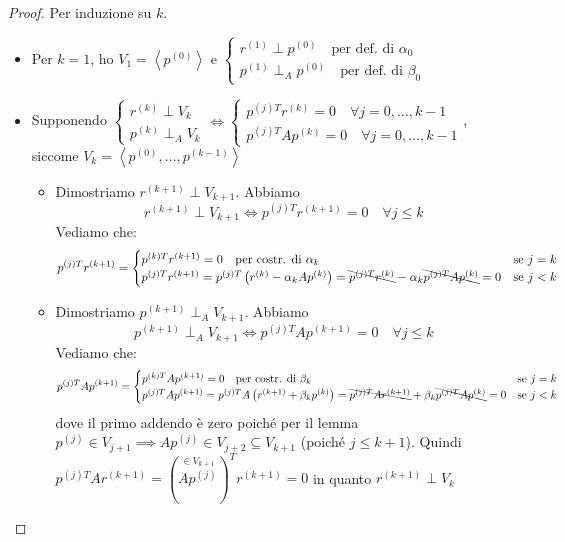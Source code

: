 \documentclass[a4paper,10pt]{article}
\theoremstyle{definition}
\theoremstyle{indentdefinition}
\theoremstyle{indenttheorem}
\theoremstyle{myremark}
\theoremstyle{indentgeneral}
\theoremstyle{plain}
\theoremstyle{plain}
\begin{document}
\begin{proof}
Per induzione su $k$. 
\begin{itemize}
    \item Per $k=1$, ho $V_1=\left\langle p^{(0)} \right\rangle$ e $\begin{cases}
        r^{(1)}\perp p^{(0)} \quad\text{per def. di $\alpha_0$}\\
        p^{(1)}\perp_A p^{(0)} \quad\text{per def. di $\beta_0$}
    \end{cases}$ 
    \item Supponendo $\begin{cases}
        r^{(k)}\perp V_k \\
        p^{(k)}\perp_A V_k
    \end{cases}\iff \begin{cases}
        p^{(j)T}r^{(k)}=0\quad\forall j=0,\dots,k-1\\
        p^{(j)T}Ap^{(k)}=0\quad\forall j=0,\dots,k-1
    \end{cases}$, siccome $V_k=\left\langle p^{\left(0\right)},\ldots,p^{\left(k-1\right)}\right\rangle$
    
    \begin{itemize}
        \item Dimostriamo $r^{(k+1)}\perp V_{k+1}$. Abbiamo
        $$r^{(k+1)}\perp V_{k+1}\iff p^{(j)T}r^{(k+1)}=0 \quad\forall j\le k$$
        Vediamo che:
        \[
        p^{\left(j\right)T}r^{\left(k+1\right)}=\begin{cases}
        p^{\left(k\right)T}r^{\left(k+1\right)}=0 \quad \text{per costr. di $\alpha_k$} & \text{se }j=k\\
        p^{\left(j\right)T}r^{\left(k+1\right)}=p^{\left(j\right)T}\left(r^{\left(k\right)}-\alpha_{k}Ap^{\left(k\right)}\right)=\bcancel{p^{\left(j\right)T}r^{\left(k\right)}}-\alpha_{k}\bcancel{p^{\left(j\right)T}Ap^{\left(k\right)}}=0 & \text{se }j<k
        \end{cases}
        \]
        \item Dimostriamo $p^{(k+1)}\perp_A V_{k+1}$. Abbiamo
        $$p^{(k+1)}\perp_A V_{k+1}\iff p^{(j)T}Ap^{(k+1)}=0 \quad\forall j\le k$$
        Vediamo che:
        \[
        p^{\left(j\right)T}Ap^{\left(k+1\right)}=\begin{cases}
        p^{\left(k\right)T}Ap^{\left(k+1\right)}=0 \quad \text{per costr. di $\beta_k$} & \text{se }j=k\\
        p^{\left(j\right)T}Ap^{\left(k+1\right)}=p^{\left(j\right)T}A\left(r^{\left(k+1\right)}+\beta_{k}p^{\left(k\right)}\right)=\bcancel{p^{\left(j\right)T}Ar^{\left(k+1\right)}}+\beta_{k}\bcancel{p^{\left(j\right)T}Ap^{\left(k\right)}}=0 & \text{se }j<k
        \end{cases}
        \]
        dove il primo addendo è zero poiché per il lemma $p^{(j)}\in V_{j+1}\implies Ap^{(j)}\in V_{j+2}\subseteq V_{k+1}$ (poiché $j\le k+1$). Quindi $p^{\left(j\right)T}Ar^{\left(k+1\right)}=(\overset{\in V_{k+1}}{Ap^{(j)}})^Tr^{(k+1)}=0$ in quanto $r^{(k+1)}\perp V_k$
    \end{itemize}

    
\end{itemize}


\end{proof}
\end{document}
